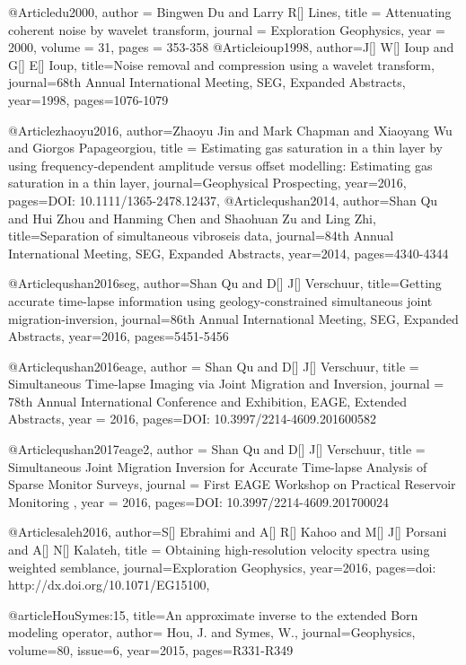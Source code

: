 @Article{du2000,
  author = 	 {Bingwen Du and Larry R[] Lines},
  title = 	 {Attenuating coherent noise by wavelet transform},
  journal = 	 {Exploration Geophysics},
  year = 	 2000,
  volume = 	 31,
  pages = 	 {353-358}}
@Article{ioup1998,
  author={J[] W[] Ioup and G[] E[] Ioup},
  title={Noise removal and compression using a wavelet transform},
  journal={68th Annual International Meeting, SEG, Expanded Abstracts},
  year=1998,
  pages={1076-1079}
}

@Article{zhaoyu2016,
  author={Zhaoyu Jin and Mark Chapman and Xiaoyang Wu and Giorgos Papageorgiou},
  title = {Estimating gas saturation in a thin layer by using frequency-dependent amplitude versus offset modelling: Estimating gas saturation in a thin layer},
  journal={Geophysical Prospecting},
  year=2016,
  pages={DOI: 10.1111/1365-2478.12437},
}
@Article{qushan2014,
  author={Shan Qu and Hui Zhou and Hanming Chen and Shaohuan Zu and Ling Zhi},
  title={Separation of simultaneous vibroseis data},
  journal={84th Annual International Meeting, SEG, Expanded Abstracts},
  year=2014,
  pages={4340-4344}
}

@Article{qushan2016seg,
  author={Shan Qu and D[] J[] Verschuur},
  title={Getting accurate time-lapse information using geology-constrained simultaneous joint migration-inversion},
  journal={86th Annual International Meeting, SEG, Expanded Abstracts},
  year=2016,
  pages={5451-5456}
}


@Article{qushan2016eage,
  author = 	 {Shan Qu and D[] J[] Verschuur},
  title = 	 {Simultaneous Time-lapse Imaging via Joint Migration and Inversion},
  journal = 	 { 78th Annual International Conference and Exhibition, EAGE, Extended Abstracts},
  year = 	 2016,
  pages={DOI: 10.3997/2214-4609.201600582}}
  

@Article{qushan2017eage2,
  author = 	 {Shan Qu and D[] J[] Verschuur},
  title = 	 {Simultaneous Joint Migration Inversion for Accurate Time-lapse Analysis of Sparse Monitor Surveys},
  journal = 	 { First EAGE Workshop on Practical Reservoir Monitoring },
  year = 	 2016,
  pages={DOI: 10.3997/2214-4609.201700024}}
  
  

@Article{saleh2016,
  author={S[] Ebrahimi and A[] R[] Kahoo and M[] J[] Porsani and A[] N[] Kalateh},
  title = {Obtaining high-resolution velocity spectra using weighted semblance},
  journal={Exploration Geophysics},
  year=2016,
  pages={doi: http://dx.doi.org/10.1071/EG15100},
}

@article{HouSymes:15,
title={An approximate inverse to the extended {B}orn modeling operator},
author= {Hou, J. and Symes, W.},
journal={Geophysics},
volume={80},
issue={6},
year={2015},
pages={R331-R349}
}

